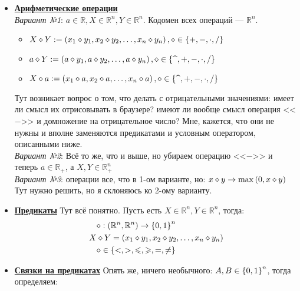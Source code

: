 \begin{itemize}
	\item \textbf{\underline{Арифметические операции}} 
	\vspace{3pt}
	\\\emph{Вариант №1}: $a \in \mathbb{R}, X \in \mathbb{R}^n, Y \in \mathbb{R}^n$. Кодомен всех операций --- $\mathbb{R}^n$.
		\begin{itemize}
			\item $X \diamond Y := \left( x_1 \diamond y_1, x_2 \diamond y_2, \ldots, x_n \diamond y_n \right), \diamond \in \left\lbrace +, -, \cdot, / \right\rbrace$
			\item $a \diamond Y := \left( a \diamond y_1, a \diamond y_2, \ldots, a \diamond y_n \right), \diamond \in \left\lbrace \text{\textasciicircum}, +, -, \cdot, / \right\rbrace$
			\item $X \diamond a := \left( x_1 \diamond a, x_2 \diamond a, \ldots, x_n \diamond a \right), \diamond \in \left\lbrace \text{\textasciicircum}, +, -, \cdot, / \right\rbrace$
		\end{itemize}
	Тут возникает вопрос о том, что делать с отрицательными значениями: имеет ли смысл их отрисовывать в браузере? имеют ли вообще смысл операция <<$-$>> и домножение на отрицательное число? Мне, кажется, что они не нужны и вполне заменяются предикатами и условным оператором, описанными ниже.
	\vspace{3pt}
	\\\emph{Вариант №2}: Всё то же, что и выше, но убираем операцию <<$-$>> и теперь $a \in \mathbb{R}_+$, а $X, Y \in \mathbb{R}_+^n$
	\\\emph{Вариант №3}: операции все, что в 1-ом варианте, но: $x \diamond y \rightarrow \max{\left( 0, x \diamond y \right)}$
	\vspace{5pt}
	\\Тут нужно решить, но я склоняюсь ко 2-ому варианту.
	\item \textbf{\underline{Предикаты}} Тут всё понятно. Пусть есть $X \in \mathbb{R}^n, Y \in \mathbb{R}^n$, тогда:
	\begin{align*}
		&\diamond: \left( \mathbb{R}^n, \mathbb{R}^n \right) \rightarrow \left\lbrace 0, 1 \right\rbrace^n \\
		X &\diamond Y = \left( x_1 \diamond y_1, x_2 \diamond y_2, \ldots, x_n \diamond y_n \right)\\
		&\diamond \in \left\lbrace  <, >, \leqslant, \geqslant, =, \neq  \right\rbrace
	\end{align*}
	\item \textbf{\underline{Связки на предикатах}} Опять же, ничего необычного: $A, B \in \left\lbrace 0, 1 \right\rbrace^n$, тогда определяем:

\end{itemize}
